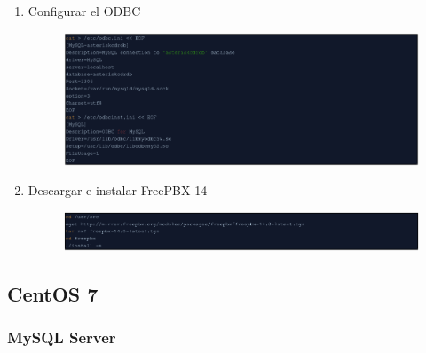 \documentclass{article}
\begin{document}
\begin{enumerate}
  \item Configurar el ODBC
  \begin{figure}[!h]
    \centering
      \includegraphics[width=\columnwidth]{images/pbx-11.png}
    \label{fig:graph}
  \end{figure}
  
  \item Descargar e instalar FreePBX 14
  \begin{figure}[!h]
    \centering
      \includegraphics[width=\columnwidth]{images/pbx-12.png}
    \label{fig:graph}
  \end{figure}
\end{enumerate}

\subsection{CentOS 7}
\subsubsection{MySQL Server}
\end{document}
